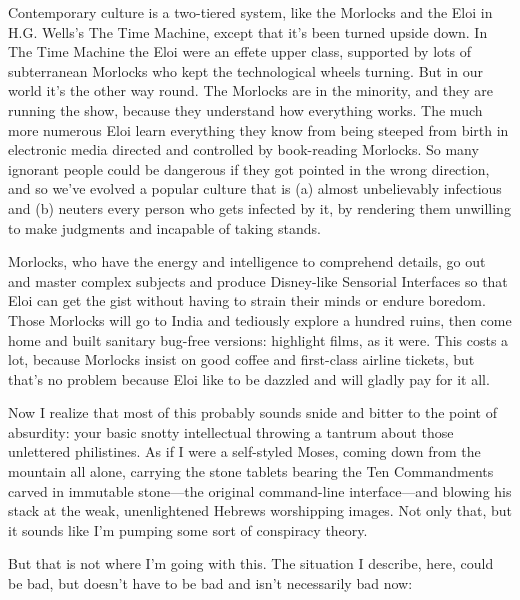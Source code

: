 \documentclass[
  fontsize=11pt,
  paper=landscape,
  twocolumn=true,
  pagesize=pdftex,
  headings=small,
  DIV=15,
  ]{scrartcl}
\begin{document}
Contemporary culture is a two-tiered system, like the Morlocks and the
Eloi in H.G. Wells's The Time Machine, except that it's been turned
upside down. In The Time Machine the Eloi were an effete upper class,
supported by lots of subterranean Morlocks who kept the technological
wheels turning. But in our world it's the other way round. The Morlocks
are in the minority, and they are running the show, because they
understand how everything works. The much more numerous Eloi learn
everything they know from being steeped from birth in electronic media
directed and controlled by book-reading Morlocks. So many ignorant
people could be dangerous if they got pointed in the wrong direction,
and so we've evolved a popular culture that is (a) almost unbelievably
infectious and (b) neuters every person who gets infected by it, by
rendering them unwilling to make judgments and incapable of taking
stands.

Morlocks, who have the energy and intelligence to comprehend details, go
out and master complex subjects and produce Disney-like Sensorial
Interfaces so that Eloi can get the gist without having to strain their
minds or endure boredom. Those Morlocks will go to India and tediously
explore a hundred ruins, then come home and built sanitary bug-free
versions: highlight films, as it were. This costs a lot, because
Morlocks insist on good coffee and first-class airline tickets, but
that's no problem because Eloi like to be dazzled and will gladly pay
for it all.

Now I realize that most of this probably sounds snide and bitter to the
point of absurdity: your basic snotty intellectual throwing a tantrum
about those unlettered philistines. As if I were a self-styled Moses,
coming down from the mountain all alone, carrying the stone tablets
bearing the Ten Commandments carved in immutable stone---the original
command-line interface---and blowing his stack at the weak,
unenlightened Hebrews worshipping images. Not only that, but it sounds
like I'm pumping some sort of conspiracy theory.

But that is not where I'm going with this. The situation I describe,
here, could be bad, but doesn't have to be bad and isn't necessarily bad
now:
\end{document}
